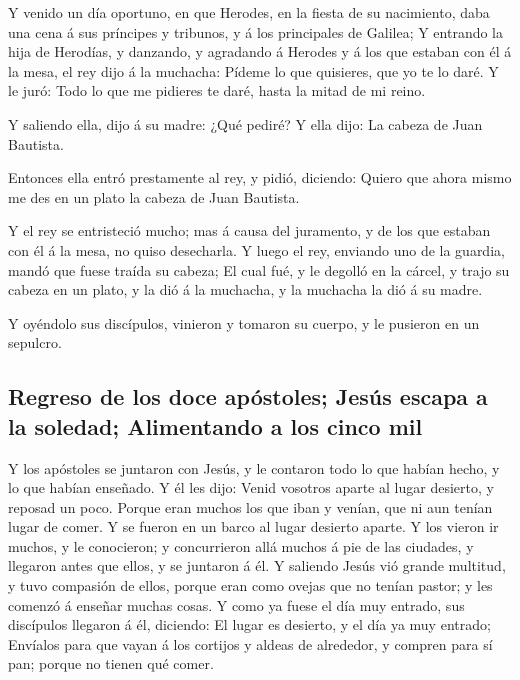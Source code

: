  Y venido un día oportuno, en que Herodes, en la fiesta
de su nacimiento, daba una cena á sus príncipes y tribunos, y á los
principales de Galilea;  Y entrando la hija de Herodías,
y danzando, y agradando á Herodes y á los que estaban con él á la mesa,
el rey dijo á la muchacha: Pídeme lo que quisieres, que yo te lo daré.
 Y le juró: Todo lo que me pidieres te daré, hasta la
mitad de mi reino.

 Y saliendo ella, dijo á su madre: ¿Qué pediré? Y ella
dijo: La cabeza de Juan Bautista.

 Entonces ella entró prestamente al rey, y pidió,
diciendo: Quiero que ahora mismo me des en un plato la cabeza de Juan
Bautista.

 Y el rey se entristeció mucho; mas á causa del
juramento, y de los que estaban con él á la mesa, no quiso desecharla.
 Y luego el rey, enviando uno de la guardia, mandó que
fuese traída su cabeza;  El cual fué, y le degolló en la
cárcel, y trajo su cabeza en un plato, y la dió á la muchacha, y la
muchacha la dió á su madre.

 Y oyéndolo sus discípulos, vinieron y tomaron su cuerpo,
y le pusieron en un sepulcro.

\hypertarget{regreso-de-los-doce-apuxf3stoles-jesuxfas-escapa-a-la-soledad-alimentando-a-los-cinco-mil}{%
\subsection{Regreso de los doce apóstoles; Jesús escapa a la soledad;
Alimentando a los cinco
mil}\label{regreso-de-los-doce-apuxf3stoles-jesuxfas-escapa-a-la-soledad-alimentando-a-los-cinco-mil}}

 Y los apóstoles se juntaron con Jesús, y le contaron
todo lo que habían hecho, y lo que habían enseñado.  Y él
les dijo: Venid vosotros aparte al lugar desierto, y reposad un poco.
Porque eran muchos los que iban y venían, que ni aun tenían lugar de
comer.  Y se fueron en un barco al lugar desierto aparte.
 Y los vieron ir muchos, y le conocieron; y concurrieron
allá muchos á pie de las ciudades, y llegaron antes que ellos, y se
juntaron á él.  Y saliendo Jesús vió grande multitud, y
tuvo compasión de ellos, porque eran como ovejas que no tenían pastor; y
les comenzó á enseñar muchas cosas.  Y como ya fuese el
día muy entrado, sus discípulos llegaron á él, diciendo: El lugar es
desierto, y el día ya muy entrado;  Envíalos para que
vayan á los cortijos y aldeas de alrededor, y compren para sí pan;
porque no tienen qué comer.

